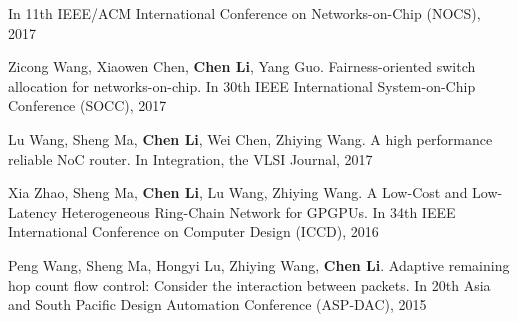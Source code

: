 \begin{resume}
\begin{enumerate}[{[}1{]}]
        In 11th IEEE/ACM International Conference on Networks-on-Chip (NOCS), 2017
  \item Zicong Wang, Xiaowen Chen, \textbf{Chen Li}, Yang Guo. Fairness-oriented switch allocation for networks-on-chip.
        In 30th IEEE International System-on-Chip Conference (SOCC), 2017
  \item Lu Wang, Sheng Ma, \textbf{Chen Li}, Wei Chen, Zhiying Wang. A high performance reliable NoC router.
        In Integration, the VLSI Journal, 2017
  \item Xia Zhao, Sheng Ma, \textbf{Chen Li}, Lu Wang, Zhiying Wang. A Low-Cost and Low-Latency Heterogeneous Ring-Chain Network for GPGPUs.
        In 34th IEEE International Conference on Computer Design (ICCD), 2016
  \item Peng Wang, Sheng Ma, Hongyi Lu, Zhiying Wang, \textbf{Chen Li}. Adaptive remaining hop count flow control: Consider the interaction between packets.
        In 20th Asia and South Pacific Design Automation Conference (ASP-DAC), 2015

  \end{enumerate}

\end{resume}
